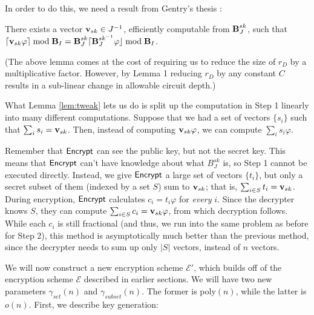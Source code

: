In order to do this, we need a result from Gentry's thesis  \cite{gentry2009fully}:
\begin{lemma} \label{lem:tweak}
There exists a vector ${\bf v}_{sk} \in J ^{-1}$, efficiently computable from $\textbf{B}_J^{sk}$, such that $\lceil {\bf v}_{sk} \varphi \rceil \bmod \textbf{B}_I = \textbf{B}_J^{sk} \lceil \textbf{B}_J^{sk ^{-1}} \varphi \rfloor \bmod \textbf{B}_I$.
\end{lemma}
(The above lemma comes at the cost of requiring us to reduce the size of $r_D$ by a multiplicative factor. However, by Lemma 1 reducing $r_D$ by any constant $C$ results in a sub-linear change in allowable circuit depth.)

What Lemma \ref{lem:tweak} lets us do is split up the computation in Step 1 linearly into many different computations. Suppose that we had a set of vectors $\{s_i\}$ such that $\sum_i s_i = {\bf v}_{sk}$. Then, instead of computing ${\bf v}_{sk} \varphi$, we can compute $\sum_i s_i \varphi$.

Remember that ${\sf Encrypt}$ can see the public key, but not the secret key. This means that ${\sf Encrypt}$ can't have knowledge about what $B_J^{sk}$ is, so Step 1 cannot be executed directly. Instead, we give ${\sf Encrypt}$ a large set of vectors $\{t_i\}$, but only a secret subset of them (indexed by a set $S$) sum to ${\bf v}_{sk}$; that is, $\sum_{i \in S} t_i = {\bf v}_{sk}$. During encryption, ${\sf Encrypt}$ calculates $c_i = t_i \varphi$ for \emph{every} $i$. Since the decrypter knows $S$, they can compute $\sum_{i \in S} c_i = {\bf v}_{sk} \varphi$, from which decryption follows. While each $c_i$ is still fractional (and thus, we run into the same problem as before for Step 2), this method is asymptotically much better than the previous method, since the decrypter needs to sum up only $|S|$ vectors, instead of $n$ vectors.


We will now construct a new encryption scheme $\mathcal{E}'$, which builds off of the encryption scheme $\mathcal{E}$ described in earlier sections. We will have two new parameters $\gamma_{set}(n)$ and $\gamma_{subset}(n)$. The former is poly$(n)$, while the latter is $o(n)$. First, we describe key generation:

